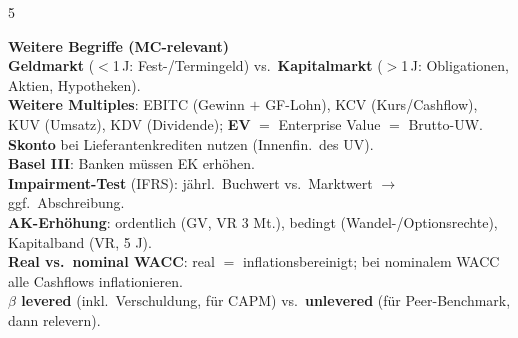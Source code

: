 \documentclass[10pt,a4paper,landscape]{extarticle}
\newcommand{\K}[1]{\textbf{\color{cB}#1}}
\begin{document}
\begin{multicols}{5}
\begin{tcolorbox}[colback=cBox,colframe=cA,boxrule=0.35pt,left=2.5pt,right=2.5pt,top=2pt,bottom=2pt,arc=1pt]
\textbf{Weitere Begriffe (MC-relevant)}\\
\K{Geldmarkt} ($<$1\,J: Fest-/Termingeld) vs.\ \K{Kapitalmarkt} ($>$1\,J: Obligationen, Aktien, Hypotheken).\\
\K{Weitere Multiples}: EBITC (Gewinn $+$ GF-Lohn), KCV (Kurs/Cashflow), KUV (Umsatz), KDV (Dividende); \K{EV} $=$ Enterprise Value $=$ Brutto-UW.\\
\K{Skonto} bei Lieferantenkrediten nutzen (Innenfin.\ des UV).\\
\K{Basel III}: Banken müssen EK erhöhen.\\
\K{Impairment-Test} (IFRS): jährl.\ Buchwert vs.\ Marktwert $\to$ ggf.\ Abschreibung.\\
\K{AK-Erhöhung}: ordentlich (GV, VR 3 Mt.), bedingt (Wandel-/Optionsrechte), Kapitalband (VR, 5 J).\\
\K{Real vs.\ nominal WACC}: real $=$ inflationsbereinigt; bei nominalem WACC alle Cashflows inflationieren.\\
\K{$\beta$ levered} (inkl.\ Verschuldung, für CAPM) vs.\ \K{unlevered} (für Peer-Benchmark, dann relevern).
\end{tcolorbox}

\end{multicols}
\end{document}
